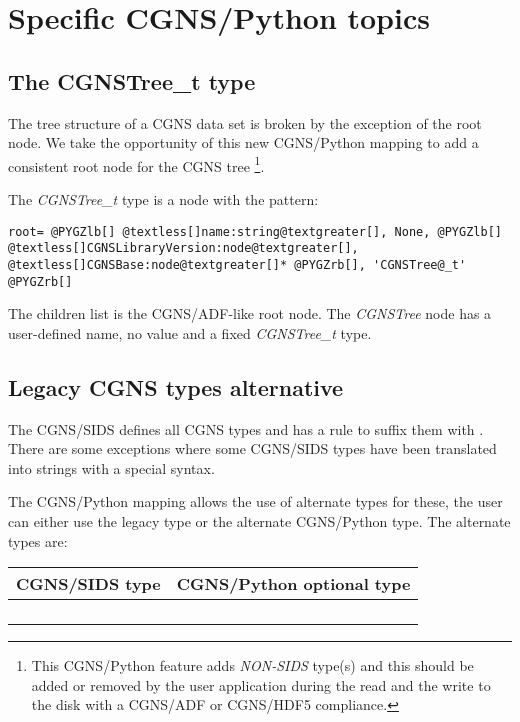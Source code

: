 \documentclass[a4paper,10pt,english]{sphinxmanual}
\begin{document}
\chapter{Specific CGNS/Python topics}
\label{sids-to-python:specific-cgns-python-topics}

\section{The CGNSTree\_t type}
\label{sids-to-python:reference-cgnstree-t}\label{sids-to-python:the-cgnstree-t-type}
The tree structure of a CGNS data set is broken by the exception of the root
node. We take the opportunity of this new CGNS/Python mapping to add a
consistent root node for the CGNS tree \footnote{
This CGNS/Python feature adds \emph{NON-SIDS} type(s) and this should be
added or removed by the user application during the read and the
write to the disk with a CGNS/ADF or CGNS/HDF5 compliance.
}.

The \emph{CGNSTree\_t} type is a node with the pattern:

\begin{Verbatim}[commandchars=@\[\]]
root= @PYGZlb[] @textless[]name:string@textgreater[], None, @PYGZlb[] @textless[]CGNSLibraryVersion:node@textgreater[], @textless[]CGNSBase:node@textgreater[]* @PYGZrb[], 'CGNSTree@_t' @PYGZrb[]
\end{Verbatim}

The children list is the CGNS/ADF-like root node. The \emph{CGNSTree} node has a
user-defined name, no value and a fixed \emph{CGNSTree\_t} type.


\section{Legacy CGNS types alternative}
\label{sids-to-python:legacy-cgns-types-alternative}
The CGNS/SIDS defines all CGNS types and has a rule to suffix them with .
There are some exceptions where some CGNS/SIDS types have been translated
into strings with a special syntax.

The CGNS/Python mapping allows the use of alternate types for these, the
user can either use the legacy type or the alternate CGNS/Python type.
The alternate types are:

\begin{tabulary}{\linewidth}{|L|L|}
\hline
\textbf{
CGNS/SIDS type
} & \textbf{
CGNS/Python optional type
}\\
\hline

 & 
\\

 & 
\\

 & 
\\

 & 
\\
\hline
\end{tabulary}
\end{document}
